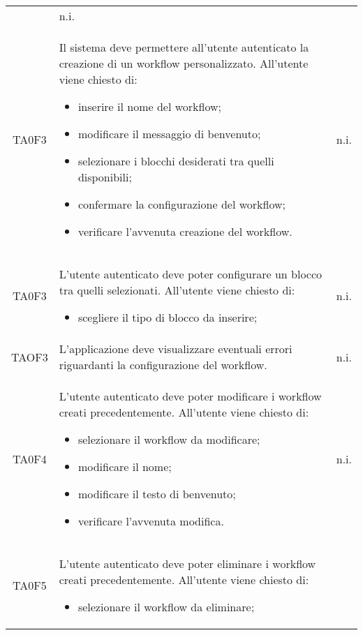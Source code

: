 \begin{center}
\begin{longtable}{ c m{12cm} c }
\begin{itemize}
	\end{itemize}  																																								& n.i. \\ 
	TA0F3  & Il sistema deve permettere all'utente autenticato la creazione di un workflow personalizzato. All'utente viene chiesto di:
	\begin{itemize}			
		\item inserire il nome del workflow;			
		\item modificare il messaggio di benvenuto;			
		\item selezionare i blocchi desiderati tra quelli disponibili;			
		\item confermare la configurazione del workflow;			
		\item verificare l'avvenuta creazione del workflow.			
	\end{itemize}  																												      											& n.i. \\                             
	TA0F3  & L'utente autenticato deve poter configurare un blocco tra quelli selezionati. All'utente viene chiesto di:
	\begin{itemize}			
		\item scegliere il tipo di blocco da inserire;			
	\end{itemize}                                           		    			                                                  											& n.i. \\
	TAOF3   & L'applicazione deve visualizzare eventuali errori riguardanti la configurazione del workflow.                            											& n.i. \\
	TA0F4   & L'utente autenticato deve poter modificare i workflow creati precedentemente. All'utente viene chiesto di: 
	\begin{itemize}			
		\item selezionare il workflow da modificare;			
		\item modificare il nome;			
		\item modificare il testo di benvenuto;	
		\item verificare l'avvenuta modifica.			
	\end{itemize}   																												   											& n.i. \\
	TA0F5  & L'utente autenticato deve poter eliminare i workflow creati precedentemente. All'utente viene chiesto di: 
	\begin{itemize}			
		\item selezionare il workflow da eliminare;			

\end{itemize}
\end{longtable}
\end{center}
